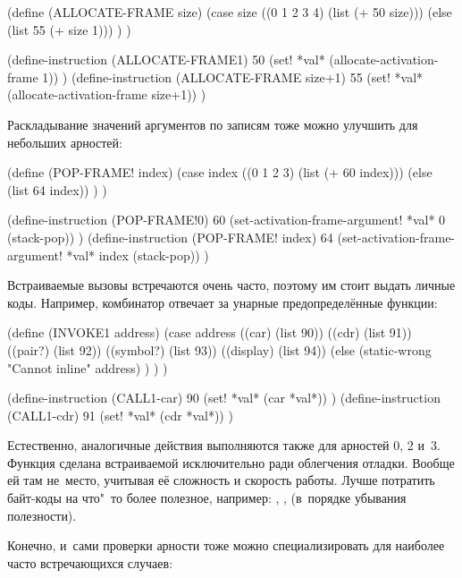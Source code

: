 \begin{code:lisp}
(define (ALLOCATE-FRAME size)
  (case size
    ((0 1 2 3 4) (list (+ 50 size)))
    (else        (list 55 (+ size 1))) ) )

(define-instruction (ALLOCATE-FRAME1) 50
  (set! *val* (allocate-activation-frame 1)) )
(define-instruction (ALLOCATE-FRAME size+1) 55
  (set! *val* (allocate-activation-frame size+1)) )
\end{code:lisp}

Раскладывание значений аргументов по записям тоже можно улучшить для небольших
арностей:

\begin{code:lisp}
(define (POP-FRAME! index)
  (case index
    ((0 1 2 3) (list (+ 60 index)))
    (else      (list 64 index)) ) )

(define-instruction (POP-FRAME!0) 60
  (set-activation-frame-argument! *val* 0 (stack-pop)) )
(define-instruction (POP-FRAME! index) 64
  (set-activation-frame-argument! *val* index (stack-pop)) )
\end{code:lisp}

Встраиваемые вызовы встречаются очень часто, поэтому им стоит выдать личные
коды. Например, комбинатор  отвечает за унарные предопределённые
функции:

\begin{code:lisp}
(define (INVOKE1 address)
  (case address
    ((car)     (list 90))
    ((cdr)     (list 91))
    ((pair?)   (list 92))
    ((symbol?) (list 93))
    ((display) (list 94))
    (else
     (static-wrong "Cannot inline" address) ) ) )

(define-instruction (CALL1-car) 90
  (set! *val* (car *val*)) )
(define-instruction (CALL1-cdr) 91
  (set! *val* (cdr *val*)) )
\end{code:lisp}

Естественно, аналогичные действия выполняются также для арностей 0, 2 и~3.
Функция  сделана встраиваемой исключительно ради облегчения отладки.
Вообще ей там не~место, учитывая её сложность и скорость работы. Лучше потратить
байт-коды на что"~то более полезное, например: , , 
(в~порядке убывания полезности).

Конечно, и~сами проверки арности тоже можно специализировать для наиболее часто
встречающихся случаев:

